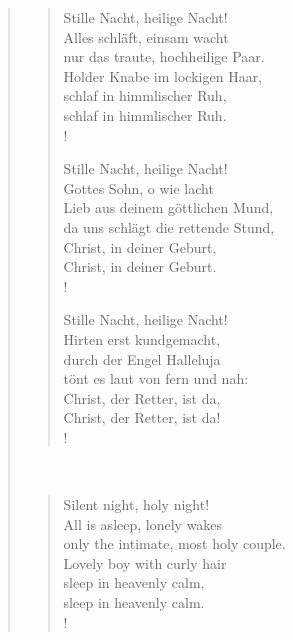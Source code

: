 \documentclass[12pt,paper=a4]{scrartcl}
\begin{document}
\begin{quote}
\begin{minipage}{.5\linewidth}
\begin{verse}
\renewcommand*{\vrightskip}{-2em}
\verselinenumbersleft
{}
\begin{patverse}
Stille Nacht, heilige Nacht!\\
Alles schläft, einsam wacht\\
nur das traute, hochheilige Paar.\\
Holder Knabe im lockigen Haar,\\
schlaf in himmlischer Ruh,\\
schlaf in himmlischer Ruh.\\!
\end{patverse}

\begin{patverse}
Stille Nacht, heilige Nacht!\\
Gottes Sohn, o wie lacht\\
Lieb aus deinem göttlichen Mund,\\
da uns schlägt die rettende Stund,\\
Christ, in deiner Geburt,\\
Christ, in deiner Geburt.\\!
\end{patverse}

\begin{patverse}
Stille Nacht, heilige Nacht!\\
Hirten erst kundgemacht,\\
durch der Engel Halleluja\\
tönt es laut von fern und nah:\\
Christ, der Retter, ist da,\\
Christ, der Retter, ist da!\\!
\end{patverse}
\end{verse}
\end{minipage}
~
\begin{minipage}{.5\linewidth}
\itshape
\begin{verse}
\begin{patverse}
Silent night, holy night!\\
All is asleep, lonely wakes\\
only the intimate, most holy couple.\\
Lovely boy with curly hair\\
sleep in heavenly calm,\\
sleep in heavenly calm.\\!
\end{patverse}


\end{verse}
\end{minipage}
\end{quote}
\end{document}
